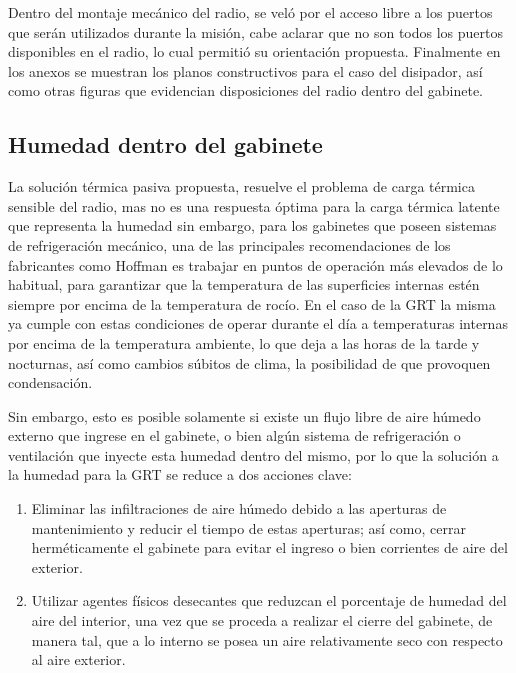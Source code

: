 Dentro del montaje mecánico del radio, se veló por el acceso libre a los puertos que serán utilizados durante la misión, cabe aclarar que no son todos los puertos disponibles en el radio, lo cual permitió su orientación propuesta. Finalmente en los anexos se muestran los planos constructivos para el caso del disipador, así como otras figuras que evidencian disposiciones del radio dentro del gabinete.

\subsection{Humedad dentro del gabinete}

La solución térmica pasiva propuesta, resuelve el problema de carga térmica sensible del radio, mas no es una respuesta óptima para la carga térmica latente que representa la humedad sin embargo, para los gabinetes que poseen sistemas de refrigeración mecánico, una de las principales recomendaciones de los fabricantes como Hoffman es trabajar en puntos de operación más elevados de lo habitual, para garantizar que la temperatura de las superficies internas estén siempre por encima de la temperatura de rocío. En el caso de la GRT la misma ya cumple con estas condiciones de operar durante el día a temperaturas internas por encima de la temperatura ambiente, lo que deja a las horas de la tarde y nocturnas, así como cambios súbitos de clima, la posibilidad de que provoquen condensación. \cite{risoul}

Sin embargo, esto es posible solamente si existe un flujo libre de aire húmedo externo que ingrese en el gabinete, o bien algún sistema de refrigeración o ventilación que inyecte esta humedad dentro del mismo, por lo que la solución a la humedad para la GRT se reduce a dos acciones clave:

\begin{enumerate}
    \item Eliminar las infiltraciones de aire húmedo debido a las aperturas de mantenimiento y reducir el tiempo de estas aperturas; así como, cerrar herméticamente el gabinete para evitar el ingreso o bien corrientes de aire del exterior.\cite{risoul}
    \item Utilizar agentes físicos desecantes que reduzcan el porcentaje de humedad del aire del interior, una vez que se proceda a realizar el cierre del gabinete, de manera tal, que a lo interno se posea un aire relativamente seco con respecto al aire exterior.
\end{enumerate}

